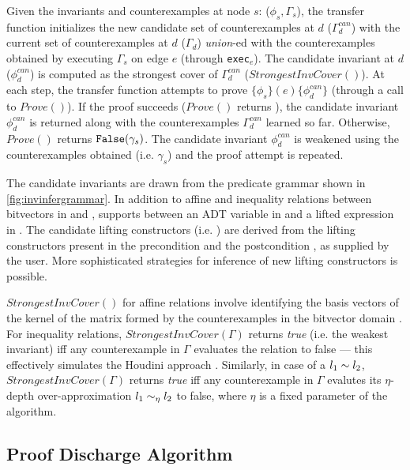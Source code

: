 Given the invariants and counterexamples at node $s$: ($\phi_s,\Gamma_s$),
the transfer function initializes the new candidate set of counterexamples at $d$ ($\Gamma^{can}_{d}$)
with the current set of counterexamples at $d$ ($\Gamma_{d}$) {\em union}-ed with
the counterexamples obtained by executing $\Gamma_s$ on edge $e$ (through {\tt exec}$_e$).
The candidate invariant at $d$ ($\phi^{can}_d$) is computed as the strongest cover
of $\Gamma^{can}_{d}$ ($StrongestInvCover()$).
At each step, the transfer function attempts to prove $\{\phi_s\} (e) \{\phi^{can}_d\}$
(through a call to $Prove()$).
If the proof succeeds ($Prove()$ returns ), the candidate invariant $\phi^{can}_d$ is returned along with
the counterexamples $\Gamma^{can}_d$ learned so far.
Otherwise, $Prove()$ returns ${\tt False}(\gamma_s)$.
The candidate invariant $\phi^{can}_d$ is weakened using the counterexamples obtained
(i.e. $\gamma_s$) and the proof attempt is repeated.

The candidate invariants are drawn from the predicate grammar \invgrammar{} shown in \cref{fig:invinfergrammar}.
In addition to affine and inequality relations between bitvectors in \sprog{} and \cprog{},
\invgrammar{} supports \recursiveRelations{} between an ADT variable in \sprog{} and a lifted expression in \cprog{}.
The candidate lifting constructors (i.e. ) are derived from the lifting constructors
present in the precondition \pre{} and the postcondition \post{}, as supplied by the user.
More sophisticated strategies for inference of new lifting constructors is possible.

$StrongestInvCover()$ for affine relations involve
identifying the basis vectors of the kernel of the
matrix formed by the counterexamples in the bitvector
domain \cite{esop05,semalign}.
For inequality relations, $StrongestInvCover(\Gamma)$
returns {\em true} (i.e. the weakest invariant) iff any counterexample in $\Gamma$ evaluates the
relation to false --- this effectively simulates the Houdini approach \cite{houdini}.
Similarly, in case of a \recursiveRelation{} $l_1 \sim{} l_2$, $StrongestInvCover(\Gamma)$
returns {\em true} iff any counterexample in $\Gamma$ evalutes its $\eta$-depth over-approximation
$l_1 \sim_\eta l_2$ to false, where $\eta$ is a fixed parameter of the algorithm.

\subsection{Proof Discharge Algorithm}
\label{sec:proofalgo}

